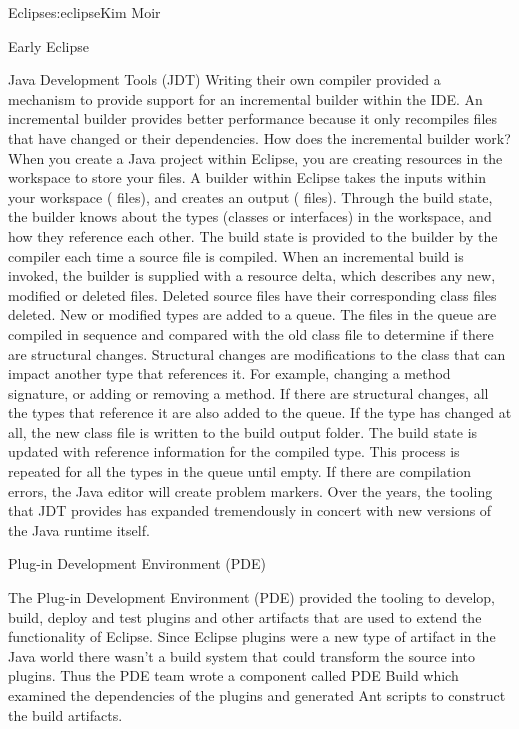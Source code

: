 \begin{aosachapter}{Eclipse}{s:eclipse}{Kim Moir}
\begin{aosasect1}{Early Eclipse}
\begin{aosasect2}{Java Development Tools (JDT)}
Writing their own compiler provided a mechanism to provide support for
an incremental builder within the IDE\@. An incremental builder provides
better performance because it only recompiles files that have changed
or their dependencies. How does the incremental builder work? When
you create a Java project within Eclipse, you are creating resources
in the workspace to store your files.  A builder within Eclipse takes
the inputs within your workspace ( files), and creates an
output ( files).  Through the build state, the builder
knows about the types (classes or interfaces) in the workspace, and
how they reference each other. The build state is provided to the
builder by the compiler each time a source file is compiled. When an
incremental build is invoked, the builder is supplied with a resource
delta, which describes any new, modified or deleted files. Deleted
source files have their corresponding class files deleted. New or
modified types are added to a queue.  The files in the queue are
compiled in sequence and compared with the old class file to determine
if there are structural changes. Structural changes are modifications
to the class that can impact another type that references it. For
example, changing a method signature, or adding or removing a
method. If there are structural changes, all the types that reference
it are also added to the queue.  If the type has changed at all, the
new class file is written to the build output folder.  The build state
is updated with reference information for the compiled type. This
process is repeated for all the types in the queue until empty. If
there are compilation errors, the Java editor will create problem
markers. Over the years, the tooling that JDT provides has expanded
tremendously in concert with new versions of the Java runtime itself.

\end{aosasect2}

\begin{aosasect2}{Plug-in Development Environment (PDE) }

The Plug-in Development Environment (PDE) provided the tooling to
develop, build, deploy and test plugins and other artifacts that are
used to extend the functionality of Eclipse. Since Eclipse plugins
were a new type of artifact in the Java world there wasn't a build
system that could transform the source into plugins.  Thus the PDE
team wrote a component called PDE Build which examined the
dependencies of the plugins and generated Ant scripts to construct
the build artifacts.


\end{aosasect2}
\end{aosasect1}
\end{aosachapter}
